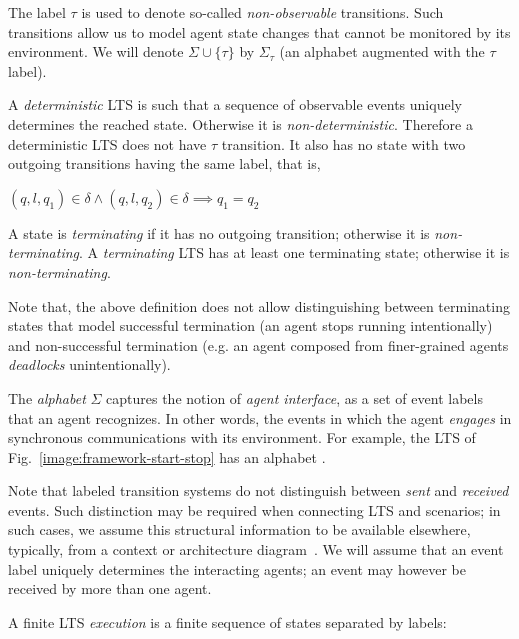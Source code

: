The label $\tau$ is used to denote so-called \emph{non-observable} transitions. Such transitions allow us to model agent state changes that cannot be monitored by its environment. We will denote $\Sigma\cup\{\tau\}$ by $\Sigma_{\tau}$ (an alphabet augmented with the $\tau$ label).

A \emph{deterministic} LTS is such that a sequence of observable events uniquely determines the reached state. Otherwise it is \emph{non-deterministic}. Therefore a deterministic LTS does not have $\tau$ transition. It also has no state with two outgoing transitions having the same label, that is, 

\begin{center}$(q,l,q_1) \in \delta \wedge (q,l,q_2) \in \delta \implies q_1 = q_2$\end{center}

A state is \emph{terminating} if it has no outgoing transition; otherwise it is \emph{non-terminating}. A \emph{terminating} LTS has at least one terminating state; otherwise it is \emph{non-terminating}. 

Note that, the above definition does not allow distinguishing between terminating states that model successful termination (an agent stops running intentionally) and non-successful termination (e.g. an agent composed from finer-grained agents \emph{deadlocks} unintentionally). 

The \emph{alphabet} $\Sigma$ captures the notion of \emph{agent interface}, as a set of event labels that an agent recognizes. In other words, the events in which the agent \emph{engages} in synchronous communications with its environment. For example, the LTS of Fig.~\ref{image:framework-start-stop} has an alphabet . 

Note that labeled transition systems do not distinguish between \emph{sent} and \emph{received} events. Such distinction may be required when connecting LTS and scenarios; in such cases, we assume this structural information to be available elsewhere, typically, from a context or architecture diagram~\cite{Ward:1985, Magee:1995}. We will assume that an event label uniquely determines the interacting agents; an event may however be received by more than one agent. 

A finite LTS \emph{execution} is a finite sequence of states separated by labels: 

\begin{center}
\end{center}

